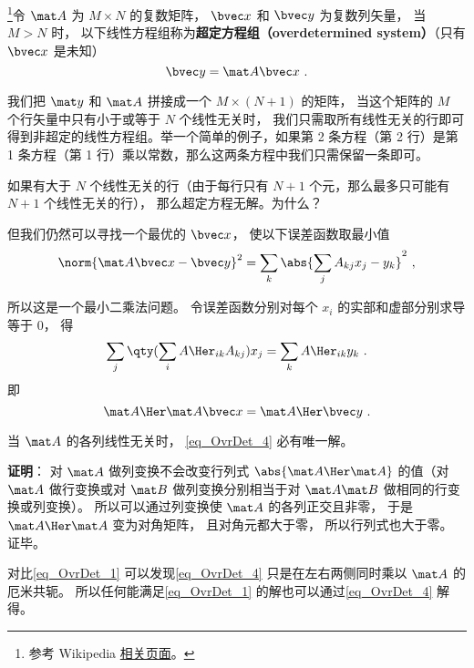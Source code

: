 

\footnote{参考 Wikipedia \href{https://en.wikipedia.org/wiki/Overdetermined_system}{相关页面}。}令 $\mat A$ 为 $M\times N$ 的复数矩阵， $\bvec x$ 和 $\bvec y$ 为复数列矢量， 当 $M > N$ 时， 以下线性方程组称为\textbf{超定方程组（overdetermined system）}（只有 $\bvec x$ 是未知）
\begin{equation}\label{eq_OvrDet_1}
\bvec y = \mat A \bvec x~.
\end{equation}

我们把 $\mat y$ 和 $\mat A$ 拼接成一个 $M\times(N+1)$ 的矩阵， 当这个矩阵的 $M$ 个行矢量中只有小于或等于 $N$ 个线性无关时， 我们只需取所有线性无关的行即可得到非超定的线性方程组。举一个简单的例子，如果第 2 条方程（第 2 行）是第 1 条方程（第 1 行）乘以常数，那么这两条方程中我们只需保留一条即可。

如果有大于 $N$ 个线性无关的行（由于每行只有 $N+1$ 个元，那么最多只可能有 $N+1$ 个线性无关的行）， 那么超定方程无解。为什么？

但我们仍然可以寻找一个最优的 $\bvec x$， 使以下误差函数取最小值
\begin{equation}
\norm{\mat A\bvec x - \bvec y}^2 =  \sum_k  \abs{\sum_j A_{kj} x_j - y_k}^2~,
\end{equation}

所以这是一个最小二乘法问题。 令误差函数分别对每个 $x_i$ 的实部和虚部分别求导等于 0， 得
\begin{equation}
\sum_j \qty(\sum_i A\Her_{ik} A_{kj}) x_j = \sum_k A\Her_{ik} y_k~.
\end{equation}
即
\begin{equation}\label{eq_OvrDet_4}
\mat A\Her \mat A \bvec x = \mat A\Her \bvec y~.
\end{equation}

\begin{theorem}{}\label{the_OvrDet_1}
当 $\mat A$ 的各列线性无关时， \autoref{eq_OvrDet_4} 必有唯一解。
\end{theorem}

\textbf{证明}： 对 $\mat A$ 做列变换不会改变行列式 $\abs{\mat A\Her \mat A}$ 的值（对 $\mat A$ 做行变换或对 $\mat B$ 做列变换分别相当于对 $\mat A\mat B$ 做相同的行变换或列变换）。 所以可以通过列变换使 $\mat A$ 的各列正交且非零， 于是 $\mat A\Her \mat A$ 变为对角矩阵， 且对角元都大于零， 所以行列式也大于零。 证毕。

对比\autoref{eq_OvrDet_1} 可以发现\autoref{eq_OvrDet_4} 只是在左右两侧同时乘以 $\mat A$ 的厄米共轭。 所以任何能满足\autoref{eq_OvrDet_1} 的解也可以通过\autoref{eq_OvrDet_4} 解得。
